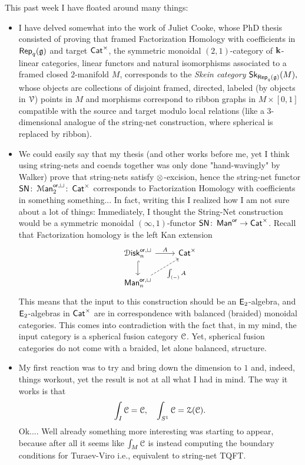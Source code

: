 This past week I have floated around many things:
\begin{itemize}
    \item I have delved somewhat into the work of Juliet Cooke, whose PhD thesis consisted of proving that framed Factorization Homology with coefficients in ${\sf Rep}_q(\frak{g})$ and target $\operatorname{{\sf Cat}}^\times$, the symmetric monoidal $(2,1)$-category of $\bf{k}$-linear categories, linear functors and natural isomorphisms associated to a framed closed $2$-manifold $M$, corresponds to the \emph{Skein category} ${\sf Sk}_{{\sf Rep}_q(\mathfrak{g})}(M),$ whose objects are collections of disjoint framed, directed, labeled (by objects in $\mathcal V$) points in $M$ and morphisms correspond to ribbon graphs in $M\times [0,1]$ compatible with the source and target modulo local relations (like a 3-dimensional analogue of the string-net construction, where spherical is replaced by ribbon). 
    \item We could easily say that my thesis (and other works before me, yet I think using string-nets and coends together was only done "hand-wavingly" by Walker) prove that string-nets satisfy $\otimes$-excision, hence the string-net functor ${\sf SN}\colon \operatorname{\mathcal M{\sf an}}^{\operatorname{\mathsf{or}},\sqcup}_2\colon \operatorname{{\sf Cat}}^\times$ corresponds to Factorization Homology with coefficients in something something... In fact, writing this I realized how I am not sure about a lot of things: Immediately, I thought the String-Net construction would be a symmetric monoidal $(\infty,1)$-functor ${\sf SN}\colon \operatorname{\sf Man}^{\operatorname{\mathsf{or}}}\rightarrow \operatorname{{\sf Cat}}^{\times}$. Recall that Factorization homology is the left Kan extension
    \[\begin{tikzcd}
	{\Disk_{n}^{\Or,\sqcup}} & {\Cat^{\times}} \\
	{\man_n^{\Or,\sqcup}}
	\arrow[hook, from=1-1, to=2-1]
	\arrow["A", from=1-1, to=1-2]
	\arrow["{\int_{(-)}A}"', dashed, from=2-1, to=1-2]
\end{tikzcd}\] This means that the input to this construction should be an $\mathsf E_2$-algebra, and $\mathsf E_2$-algebras in $\operatorname{{\sf Cat}}^\times$ are in correspondence with balanced (braided) monoidal categories. This comes into contradiction with the fact that, in my mind, the input category is a spherical fusion category $\mathcal C$. Yet, spherical fusion categories do not come with a braided, let alone balanced, structure. 
    \item My first reaction was to try and bring down the dimension to $1$ and, indeed, things workout, yet the result is not at all what I had in mind. The way it works is that \[\int_{I}\mathcal C = \mathcal C, \quad \int_{S^{1}}\mathcal C = \mathcal Z(\mathcal C).\] Ok.... Well already something more interesting was starting to appear, because after all it seems like $\int_M \mathcal C$ is instead computing the boundary conditions for Turaev-Viro i.e., equivalent to string-net TQFT.

\end{itemize}
